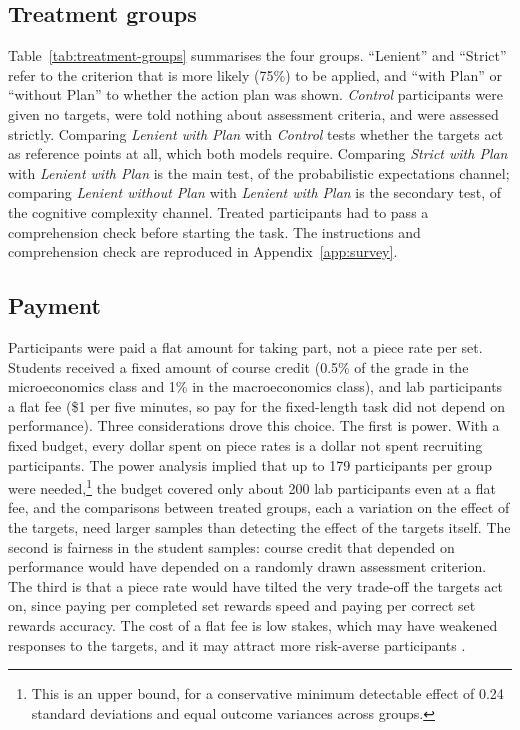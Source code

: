 \documentclass[12pt, letterpaper]{article}
\newcommand{\CtrlName}{Control}
\newcommand{\LPName}{Lenient with Plan}
\newcommand{\SPName}{Strict with Plan}
\newcommand{\LNName}{Lenient without Plan}
\newcommand{\Ctrl}{\textit{\CtrlName}}
\newcommand{\LP}{\textit{\LPName}}
\newcommand{\SP}{\textit{\SPName}}
\newcommand{\LN}{\textit{\LNName}}
\begin{document}
\subsection{Treatment groups}

Table~\ref{tab:treatment-groups} summarises the four groups. ``Lenient'' and ``Strict'' refer to the criterion that is more likely (75\%) to be applied, and ``with Plan'' or ``without Plan'' to whether the action plan was shown. \Ctrl{} participants were given no targets, were told nothing about assessment criteria, and were assessed strictly. Comparing \LP{} with \Ctrl{} tests whether the targets act as reference points at all, which both models require. Comparing \SP{} with \LP{} is the main test, of the probabilistic expectations channel; comparing \LN{} with \LP{} is the secondary test, of the cognitive complexity channel. Treated participants had to pass a comprehension check before starting the task. The instructions and comprehension check are reproduced in Appendix~\ref{app:survey}.

\subsection{Payment}

Participants were paid a flat amount for taking part, not a piece rate per set. Students received a fixed amount of course credit (0.5\% of the grade in the microeconomics class and 1\% in the macroeconomics class), and lab participants a flat fee (\$1 per five minutes, so pay for the fixed-length task did not depend on performance). Three considerations drove this choice. The first is power. With a fixed budget, every dollar spent on piece rates is a dollar not spent recruiting participants. The power analysis implied that up to 179 participants per group were needed,\footnote{This is an upper bound, for a conservative minimum detectable effect of 0.24 standard deviations and equal outcome variances across groups.} the budget covered only about 200 lab participants even at a flat fee, and the comparisons between treated groups, each a variation on the effect of the targets, need larger samples than detecting the effect of the targets itself. The second is fairness in the student samples: course credit that depended on performance would have depended on a randomly drawn assessment criterion. The third is that a piece rate would have tilted the very trade-off the targets act on, since paying per completed set rewards speed and paying per correct set rewards accuracy. The cost of a flat fee is low stakes, which may have weakened responses to the targets, and it may attract more risk-averse participants \parencite{harrison.2009.riskattitudes}.
\end{document}
